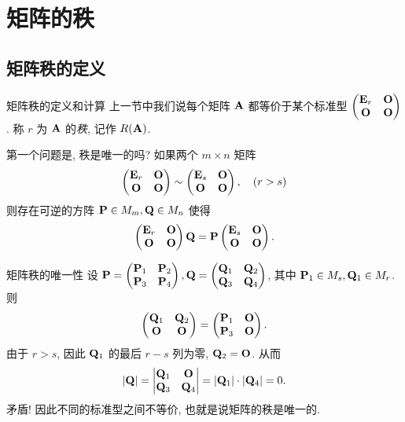 \section{矩阵的秩}

\subsection{矩阵秩的定义}

\begin{frame}{矩阵秩的定义和计算}
	\onslide<+->
	上一节中我们说每个矩阵 ${\mathbf{A}}$ 都等价于某个标准型
	$\begin{pmatrix}
		{\mathbf{E}}_r&{\mathbf{O}}\\
		{\mathbf{O}}&{\mathbf{O}}
	\end{pmatrix}$.
	\onslide<+->
	称 $r$ 为 ${\mathbf{A}}$ 的\emph{秩}, 记作 \alert{$R({\mathbf{A}})$}.

	\onslide<+->
	第一个问题是, 秩是唯一的吗?
	\onslide<+->
	如果两个 $m\times n$ 矩阵
	\[\begin{pmatrix}
		{\mathbf{E}}_r&{\mathbf{O}}\\
		{\mathbf{O}}&{\mathbf{O}}
	\end{pmatrix}\sim\begin{pmatrix}
		{\mathbf{E}}_s&{\mathbf{O}}\\
		{\mathbf{O}}&{\mathbf{O}}
	\end{pmatrix},\quad(r>s)\]
	则存在可逆的方阵 ${\mathbf{P}}\in M_m,{\mathbf{Q}}\in M_n$ 使得
	\[\begin{pmatrix}
		{\mathbf{E}}_r&{\mathbf{O}}\\
		{\mathbf{O}}&{\mathbf{O}}
	\end{pmatrix}{\mathbf{Q}}={\mathbf{P}}\begin{pmatrix}
		{\mathbf{E}}_s&{\mathbf{O}}\\
		{\mathbf{O}}&{\mathbf{O}}
	\end{pmatrix}.\]
\end{frame}


\begin{frame}{矩阵秩的唯一性}
	\onslide<+->
	设 ${\mathbf{P}}=\begin{pmatrix}
		{\mathbf{P}}_1&{\mathbf{P}}_2\\{\mathbf{P}}_3&{\mathbf{P}}_4
	\end{pmatrix},{\mathbf{Q}}=\begin{pmatrix}
		{\mathbf{Q}}_1&{\mathbf{Q}}_2\\{\mathbf{Q}}_3&{\mathbf{Q}}_4
	\end{pmatrix}$, 其中 ${\mathbf{P}}_1\in M_s,{\mathbf{Q}}_1\in M_r$.
	\onslide<+->
	则 \[\begin{pmatrix}
		{\mathbf{Q}}_1&{\mathbf{Q}}_2\\{\mathbf{O}}&{\mathbf{O}}
	\end{pmatrix}=\begin{pmatrix}
		{\mathbf{P}}_1&{\mathbf{O}}\\{\mathbf{P}}_3&{\mathbf{O}}
	\end{pmatrix}.\]
	\onslide<+->
	由于 $r>s$, 因此 ${\mathbf{Q}}_1$ 的最后 $r-s$ 列为零, ${\mathbf{Q}}_2={\mathbf{O}}$.
	\onslide<+->
	从而
	\[|{\mathbf{Q}}|=\left|\begin{matrix}
		{\mathbf{Q}}_1&{\mathbf{O}}\\{\mathbf{Q}}_3&{\mathbf{Q}}_4\end{matrix}\right|=|{\mathbf{Q}}_1|\cdot|{\mathbf{Q}}_4|=0.\]
	\onslide<+->
	矛盾! 因此不同的标准型之间不等价, 也就是说矩阵的秩是唯一的.
\end{frame}


